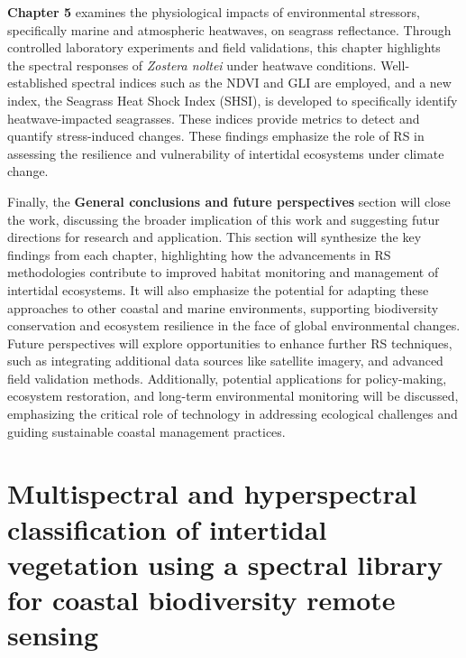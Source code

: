 \documentclass[
  letterpaper,
  11pt,
  english,
  singlespacing,
  headsepline]{MastersDoctoralThesis}
\newcommand{\chaptertopimage}{Chapter1/img/seagrasses.png}
\newcommand{\chapterbottomimage}{Chapter1/img/seagrasses.png}
\begin{document}
\begin{spacing}{1.5}
\textbf{Chapter 5} examines the physiological impacts of environmental
stressors, specifically marine and atmospheric heatwaves, on seagrass
reflectance. Through controlled laboratory experiments and field
validations, this chapter highlights the spectral responses of
\emph{Zostera noltei} under heatwave conditions. Well-established
spectral indices such as the NDVI and GLI are employed, and a new index,
the Seagrass Heat Shock Index (SHSI), is developed to specifically
identify heatwave-impacted seagrasses. These indices provide metrics to
detect and quantify stress-induced changes. These findings emphasize the
role of RS in assessing the resilience and vulnerability of intertidal
ecosystems under climate change.

Finally, the \textbf{General conclusions and future perspectives}
section will close the work, discussing the broader implication of this
work and suggesting futur directions for research and application. This
section will synthesize the key findings from each chapter, highlighting
how the advancements in RS methodologies contribute to improved habitat
monitoring and management of intertidal ecosystems. It will also
emphasize the potential for adapting these approaches to other coastal
and marine environments, supporting biodiversity conservation and
ecosystem resilience in the face of global environmental changes. Future
perspectives will explore opportunities to enhance further RS
techniques, such as integrating additional data sources like satellite
imagery, and advanced field validation methods. Additionally, potential
applications for policy-making, ecosystem restoration, and long-term
environmental monitoring will be discussed, emphasizing the critical
role of technology in addressing ecological challenges and guiding
sustainable coastal management practices.

\end{spacing}

\renewcommand{\chaptertopimage}{Chapter2/img/ASD_psd.png}
\renewcommand{\chapterbottomimage}{Chapter2/img/Seagrass_quadrats_psd.png}

\newpage\null\thispagestyle{empty}\newpage


\chapter{Multispectral and hyperspectral classification of intertidal
vegetation using a spectral library for coastal biodiversity remote
sensing}\label{multispectral-and-hyperspectral-classification-of-intertidal-vegetation-using-a-spectral-library-for-coastal-biodiversity-remote-sensing}
\end{document}
